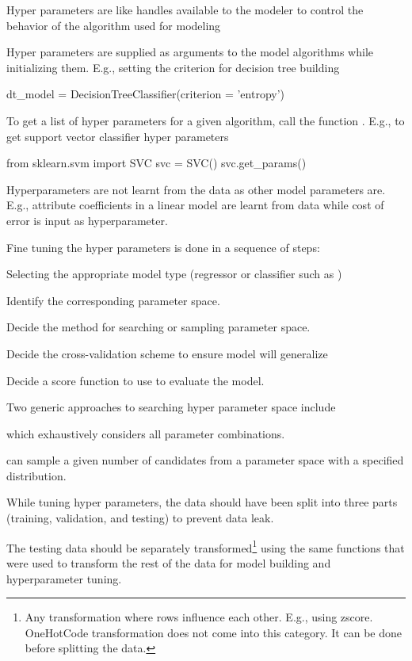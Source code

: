 	\begin{numberedlist}
		\item Hyper parameters are like handles available to the modeler to control the behavior of the algorithm used for modeling
		\item Hyper parameters are supplied as arguments to the model algorithms while initializing them.  E.g., setting the criterion for decision tree building
		\begin{code}[\codenumbering]{}
			\codeitemnonumber dt\_model = DecisionTreeClassifier(criterion = 'entropy')
		\end{code}
		\item To get a list of hyper parameters for a given algorithm, call the function .  E.g., to get support vector classifier hyper parameters
		\begin{code}[\codenumbering]{}
			\codeitemnonumber from sklearn.svm import SVC
			\codeitemnonumber svc = SVC()
			\codeitemnonumber svc.get\_params()
		\end{code}
		\item Hyperparameters are not learnt from the data as other model parameters are.  E.g., attribute coefficients in a linear model are learnt from data while cost of error is input as hyperparameter.
		\item Fine tuning the hyper parameters is done in a sequence of steps:
		\begin{numberedlist}
			\item Selecting the appropriate model type (regressor or classifier such as )
			\item Identify the corresponding parameter space.
			\item Decide the method for searching or sampling parameter space.
			\item Decide the cross-validation scheme to ensure model will generalize
			\item Decide a score function to use to evaluate the model.
		\end{numberedlist}
		\item Two generic approaches to searching hyper parameter space include
		\begin{numberedlist}
			\item {} which exhaustively considers all parameter combinations.
			\item {} can sample a given number of candidates from a parameter space with a specified distribution.
		\end{numberedlist}
		\item While tuning hyper parameters, the data should have been split into three parts (training, validation, and testing) to prevent data leak.
		\item The testing data should be separately transformed\footnote{ Any transformation where rows influence each other. E.g., using zscore. OneHotCode
transformation does not come into this category. It can be done before splitting the data.} using the same functions that were used to transform the rest of the data for model building and hyperparameter tuning.
	\end{numberedlist}

